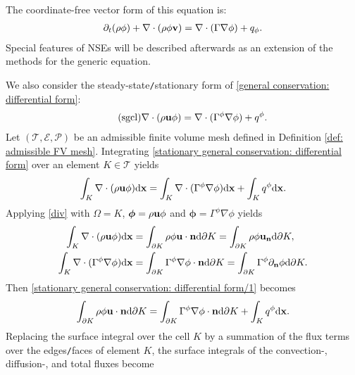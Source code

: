 \documentclass[oneside,11pt]{book}
\numberwithin{equation}{section}
\begin{document}
The coordinate-free vector form of this equation is:
\begin{align*}
    \partial_t(\rho\phi) + \nabla\cdot(\rho\phi{\bf v}) = \nabla\cdot(\Gamma\nabla\phi) + q_\phi.
\end{align*}
Special features of NSEs will be described afterwards as an extension of the methods for the generic equation.

We also consider the steady-state\texttt{/}stationary form of \eqref{general conservation: differential form}:
\begin{align}
    \label{stationary general conservation: differential form}
    \tag{sgcl}
    \nabla\cdot(\rho{\bf u}\phi) = \nabla\cdot(\Gamma^\phi\nabla\phi) + q^\phi.
\end{align}
Let $(\mathcal{T},\mathcal{E},\mathcal{P})$ be an admissible finite volume mesh defined in Definition \ref{def: admissible FV mesh}. Integrating \eqref{stationary general conservation: differential form} over an element $K\in\mathcal{T}$ yields
\begin{align}
    \label{stationary general conservation: differential form/1}
    \int_K \nabla\cdot(\rho{\bf u}\phi){\rm d}{\bf x} = \int_K \nabla\cdot(\Gamma^\phi\nabla\phi){\rm d}{\bf x} + \int_K q^\phi{\rm d}{\bf x}.
\end{align}
Applying \eqref{div} with $\Omega = K$, $\boldsymbol{\phi} = \rho{\bf u}\phi$ and $\boldsymbol{\phi} = \Gamma^\phi\nabla\phi$ yields
\begin{align*}
    \int_K \nabla\cdot(\rho{\bf u}\phi){\rm d}{\bf x} &= \int_{\partial K} \rho\phi{\bf u}\cdot{\bf n}{\rm d}\partial K = \int_{\partial K} \rho\phi{\bf u}_{\bf n}{\rm d}\partial K,\\
    \int_K \nabla\cdot(\Gamma^\phi\nabla\phi){\rm d}{\bf x} &= \int_{\partial K} \Gamma^\phi\nabla\phi\cdot{\bf n}{\rm d}\partial K = \int_{\partial K} \Gamma^\phi\partial_{\bf n}\phi{\rm d}\partial K.
\end{align*}
Then \eqref{stationary general conservation: differential form/1} becomes
\begin{align*}
    \int_{\partial K} \rho\phi{\bf u}\cdot{\bf n}{\rm d}\partial K = \int_{\partial K} \Gamma^\phi\nabla\phi\cdot{\bf n}{\rm d}\partial K + \int_K q^\phi{\rm d}{\bf x}.
\end{align*}
Replacing the surface integral over the cell $K$ by a summation of the flux terms over the edges\texttt{/}faces of element $K$, the surface integrals of the convection-, diffusion-, and total fluxes become
\end{document}

